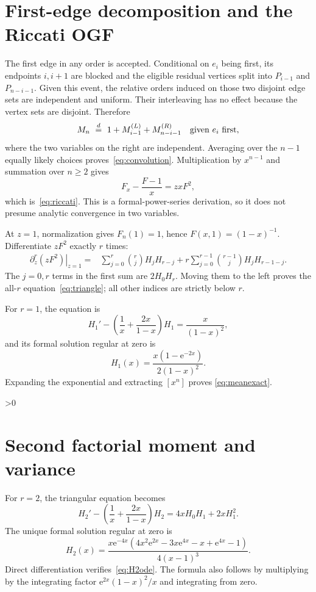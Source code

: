 \documentclass[10pt]{article}
\providecommand{\CRevisionRound}{2}
\newcommand{\e}{\mathrm e}
\begin{document}
\section{First-edge decomposition and the Riccati OGF}
The first edge in any order is accepted.  Conditional on $e_i$ being first,
its endpoints $i,i+1$ are blocked and the eligible residual vertices split
into $P_{i-1}$ and $P_{n-i-1}$.  Given this event, the relative orders induced
on those two disjoint edge sets are independent and uniform.  Their
interleaving has no effect because the vertex sets are disjoint.  Therefore
\[
 M_n\ \stackrel{d}{=}\ 1+M_{i-1}^{(L)}+M_{n-i-1}^{(R)}
 \quad\hbox{given }e_i\hbox{ first},
\]
where the two variables on the right are independent.  Averaging over the
$n-1$ equally likely choices proves~\eqref{eq:convolution}.  Multiplication by
$x^{n-1}$ and summation over $n\ge2$ gives
\[
 F_x-\frac{F-1}{x}=zxF^2,
\]
which is~\eqref{eq:riccati}.  This is a formal-power-series derivation, so it
does not presume analytic convergence in two variables.

At $z=1$, normalization gives $F_n(1)=1$, hence
$F(x,1)=(1-x)^{-1}$.  Differentiate $zF^2$ exactly $r$ times:
\begin{align*}
 \left.\partial_z^r(zF^2)\right|_{z=1}
 ={}&\sum_{j=0}^r\binom{r}{j}H_jH_{r-j}
 +r\sum_{j=0}^{r-1}\binom{r-1}{j}H_jH_{r-1-j}.
\end{align*}
The $j=0,r$ terms in the first sum are $2H_0H_r$.  Moving them to the
left proves the all-$r$ equation~\eqref{eq:triangle}; all other indices are
strictly below $r$.

For $r=1$, the equation is
\[
 H_1'-\left(\frac1x+\frac{2x}{1-x}\right)H_1
 =\frac{x}{(1-x)^2},
\]
and its formal solution regular at zero is
\begin{equation}\label{eq:H1}
 H_1(x)=\frac{x(1-\e^{-2x})}{2(1-x)^2}.
\end{equation}
Expanding the exponential and extracting $[x^n]$ proves
\eqref{eq:meanexact}.

\ifnum\CRevisionRound>0
\section{Second factorial moment and variance}
For $r=2$, the triangular equation becomes
\begin{equation}\label{eq:H2ode}
 H_2'-\left(\frac1x+\frac{2x}{1-x}\right)H_2
 =4xH_0H_1+2xH_1^2.
\end{equation}
The unique formal solution regular at zero is
\begin{equation}\label{eq:H2}
 H_2(x)=
 \frac{x\e^{-4x}
 (4x^2\e^{2x}-3x\e^{4x}-x+\e^{4x}-1)}{4(x-1)^3}.
\end{equation}
Direct differentiation verifies~\eqref{eq:H2ode}.  The formula also follows
by multiplying by the integrating factor
$\e^{2x}(1-x)^2/x$ and integrating from zero.
\end{document}

